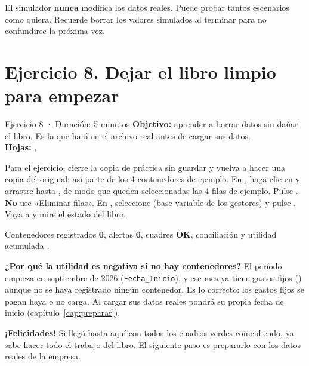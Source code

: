 \begin{nota}
El simulador \textbf{nunca} modifica los datos reales. Puede probar tantos escenarios como quiera. Recuerde borrar los valores simulados al terminar
para no confundirse la próxima vez.
\end{nota}

\section{Ejercicio 8. Dejar el libro limpio para empezar}\label{sec:ej8}

\begin{ficha}{Ejercicio 8 · Duración: 5 minutos}
\textbf{Objetivo:} aprender a borrar datos sin dañar el libro. Es lo que hará en el archivo real antes de cargar sus datos.\\
\textbf{Hojas:} , 
\end{ficha}

\begin{pasos}
\paso Para el ejercicio, cierre la copia de práctica sin guardar y vuelva a hacer una copia del original: así parte de los 4 contenedores de ejemplo.
\paso En , haga clic en  y arrastre hasta , de modo que queden seleccionadas las 4 filas de ejemplo.
\paso Pulse . \textbf{No} use «Eliminar filas».
\paso En , seleccione  (base variable de los gestores) y pulse .
\paso Vaya a  y mire el estado del libro.
\end{pasos}


\begin{resultado}
Contenedores registrados \textbf{0}, alertas \textbf{0}, cuadres \textbf{OK}, conciliación \textbf{\vEjOchoConc} y utilidad acumulada
\textcolor{red}{\textbf{\vEjOchoUAI}}.
\end{resultado}

\begin{nota}
\textbf{¿Por qué la utilidad es negativa si no hay contenedores?} El período empieza en septiembre de 2026 (\texttt{Fecha\_Inicio}), y ese mes ya
tiene gastos fijos (\vEjOchoFijos) aunque no se haya registrado ningún contenedor. Es lo correcto: los gastos fijos se pagan haya o no carga.
Al cargar sus datos reales pondrá su propia fecha de inicio (capítulo~\ref{cap:preparar}).
\end{nota}

\begin{consejo}
\textbf{¡Felicidades!} Si llegó hasta aquí con todos los cuadros verdes coincidiendo, ya sabe hacer todo el trabajo del libro.
El siguiente paso es prepararlo con los datos reales de la empresa.
\end{consejo}
